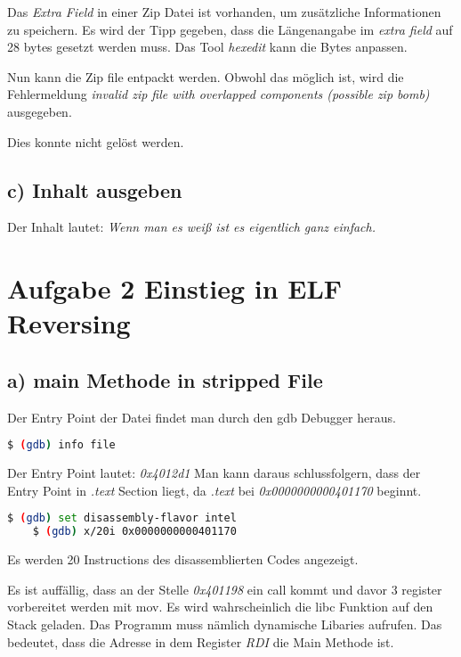 Das \textit{Extra Field} in einer Zip Datei ist vorhanden, um zusätzliche Informationen zu speichern.
Es wird der Tipp gegeben, dass die Längenangabe im \textit{extra field} auf 28 bytes gesetzt werden muss.
Das Tool \textit{hexedit} kann die Bytes anpassen.

Nun kann die Zip file entpackt werden.
Obwohl das möglich ist, wird die Fehlermeldung
\textit{invalid zip file with overlapped components (possible zip bomb)} ausgegeben.

Dies konnte nicht gelöst werden.

\subsection*{c) Inhalt ausgeben}

Der Inhalt lautet: \textit{Wenn man es weiß ist es eigentlich ganz einfach.}

\section*{Aufgabe 2 Einstieg in ELF Reversing}

\subsection*{a) main Methode in stripped File}

Der Entry Point der Datei findet man durch den gdb Debugger heraus.

\begin{lstlisting}[language=bash]
    $ (gdb) info file
\end{lstlisting}

Der Entry Point lautet: \textit{0x4012d1}
Man kann daraus schlussfolgern, dass der Entry Point in \textit{.text} Section liegt, da \textit{.text}
bei \textit{0x0000000000401170} beginnt.

\begin{lstlisting}[language=bash]
    $ (gdb) set disassembly-flavor intel
    $ (gdb) x/20i 0x0000000000401170
\end{lstlisting}

Es werden 20 Instructions des disassemblierten Codes angezeigt.

Es ist auffällig, dass an der Stelle \textit{0x401198} ein call kommt und davor 3 register vorbereitet werden mit mov.
Es wird wahrscheinlich die libc Funktion auf den Stack geladen. Das Programm muss nämlich dynamische Libaries aufrufen.
Das bedeutet, dass die Adresse in dem Register \textit{RDI} die Main Methode ist.

